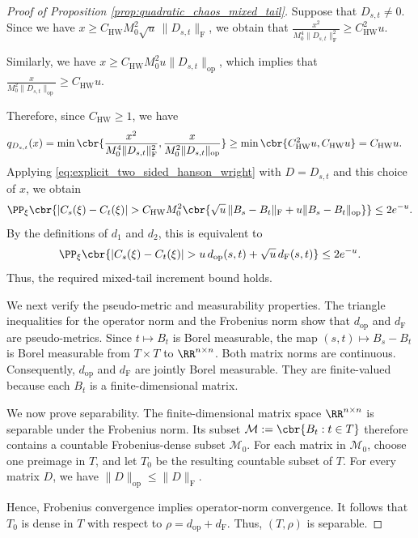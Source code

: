 \documentclass[11pt]{article}
\begin{document}
\begin{proof}[Proof of Proposition
\ref{prop:quadratic_chaos_mixed_tail}]
Suppose that
$D_{s,t}\ne0$. Since we have $x
\ge
C_{\mathrm{HW}}M_0^2
\sqrt{u}\,\|D_{s,t}\|_{\mathrm F}$, we obtain that $\frac{x^2}{
M_0^4\|D_{s,t}\|_{\mathrm F}^2
}
\ge
C_{\mathrm{HW}}^2u$.

Similarly, we have
$x
\ge
C_{\mathrm{HW}}M_0^2
u\|D_{s,t}\|_{\mathrm{op}}$, which implies that $\frac{x}{
M_0^2\|D_{s,t}\|_{\mathrm{op}}
}
\ge
C_{\mathrm{HW}}u$.

Therefore, since $C_{\mathrm{HW}}\ge1$, we have
\begin{align*}
q_{D_{s,t}}(x)
&=
\min\cbr{
\frac{x^2}{
M_0^4\|D_{s,t}\|_{\mathrm F}^2
},
\frac{x}{
M_0^2\|D_{s,t}\|_{\mathrm{op}}
}
}\ge
\min\cbr{
C_{\mathrm{HW}}^2u,
C_{\mathrm{HW}}u
}
=
C_{\mathrm{HW}}u.
\end{align*}
Applying \eqref{eq:explicit_two_sided_hanson_wright} with
$D=D_{s,t}$ and this choice of $x$, we obtain
\begin{align*}
\PP_\xi\cbr{
|C_s(\xi)-C_t(\xi)|
>
C_{\mathrm{HW}}M_0^2
\cbr{
\sqrt{u}\,\|B_s-B_t\|_{\mathrm F}
+u\|B_s-B_t\|_{\mathrm{op}}
}
}
\le2e^{-u}.
\end{align*}
By the definitions of $d_{1}$ and $d_{2}$, this is
equivalent to
\begin{align*}
\PP_\xi\cbr{
|C_s(\xi)-C_t(\xi)|
>
u\,d_{\mathrm{op}}(s,t)
+\sqrt{u}\,d_{\mathrm F}(s,t)
}
\le2e^{-u}.
\end{align*}
Thus, the required mixed-tail increment bound holds.

We next verify the pseudo-metric and measurability properties. The
triangle inequalities for the operator norm and the Frobenius norm
show that $d_{\mathrm{op}}$ and $d_{\mathrm F}$ are pseudo-metrics.
Since $t\mapsto B_t$ is Borel measurable, the map $(s,t)\mapsto B_s-B_t$
is Borel measurable from $T\times T$ to
$\RR^{n\times n}$. Both matrix norms are continuous. Consequently,
$d_{\mathrm{op}}$ and $d_{\mathrm F}$ are jointly Borel measurable.
They are finite-valued because each $B_t$ is a finite-dimensional
matrix.

We now prove separability. The finite-dimensional matrix space
$\RR^{n\times n}$ is separable under the Frobenius norm. Its subset $\mathcal M:=\cbr{B_t:t\in T}$ therefore contains a countable Frobenius-dense subset
$\mathcal M_0$. For each matrix in $\mathcal M_0$, choose one preimage
in $T$, and let $T_0$ be the resulting countable subset of $T$. For
every matrix $D$, we have $\|D\|_{\mathrm{op}}\le\|D\|_{\mathrm F}$.

Hence, Frobenius convergence implies operator-norm convergence. It
follows that $T_0$ is dense in $T$ with respect to $\rho=d_{\mathrm{op}}+d_{\mathrm F}$. Thus, $(T,\rho)$ is separable.


\end{proof}
\end{document}
